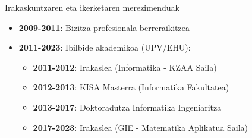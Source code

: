 \documentclass[
 10pt,%
 compress,%
 t,       %
 xcolor=svgnames
]{beamer}
\theoremstyle{definition} \newtheorem{definicion}{Definicion}[section]
\theoremstyle{propiedades} \newtheorem{propiedades}{Propiedades}[section]
\begin{document}
\begin{frame}{Irakaskuntzaren eta ikerketaren merezimenduak}
\begin{itemize}
\medskip
\item \textbf{2009-2011}: Bizitza profesionala berreraikitzea

\medskip

\item \textbf{2011-2023}: Ibilbide akademikoa (UPV/EHU): 
\begin{itemize}
\medskip
\item \textbf{2011-2012}:  Irakaslea (Informatika - KZAA Saila)

\medskip
\item \textbf{2012-2013}:  KISA Masterra (Informatika Fakultatea)%

\medskip
\item \textbf{2013-2017}:  Doktoradutza Informatika Ingeniaritza 




\medskip
\item \textbf{2017-2023}:  Irakaslea (GIE - Matematika Aplikatua Saila)

\end{itemize}

\end{itemize}

\end{frame}
\end{document}
